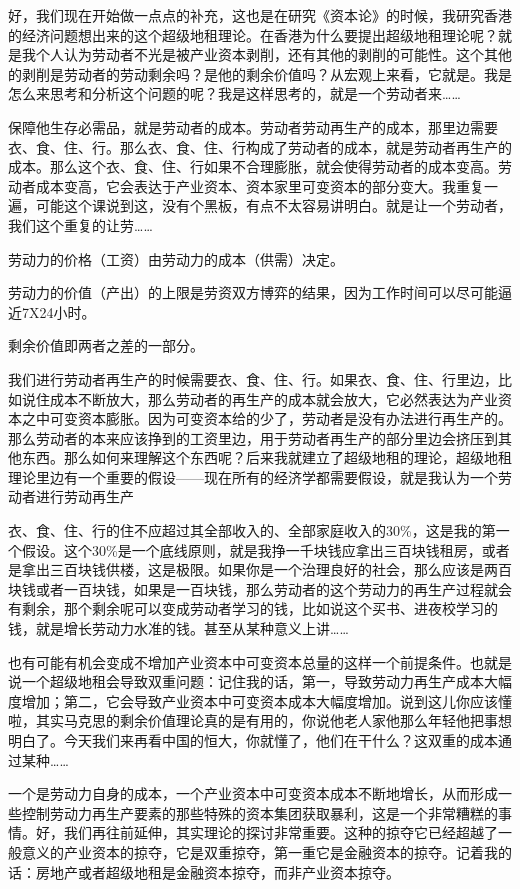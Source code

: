 \documentclass[UTF8, 12pt, a4paper]{ctexrep}
\begin{document}
好，我们现在开始做一点点的补充，这也是在研究《资本论》的时候，我研究香港的经济问题想出来的这个超级地租理论。在香港为什么要提出超级地租理论呢？就是我个人认为劳动者不光是被产业资本剥削，还有其他的剥削的可能性。这个其他的剥削是劳动者的劳动剩余吗？是他的剩余价值吗？从宏观上来看，它就是。我是怎么来思考和分析这个问题的呢？我是这样思考的，就是一个劳动者来……

保障他生存必需品，就是劳动者的成本。劳动者劳动再生产的成本，那里边需要衣、食、住、行。那么衣、食、住、行构成了劳动者的成本，就是劳动者再生产的成本。那么这个衣、食、住、行如果不合理膨胀，就会使得劳动者的成本变高。劳动者成本变高，它会表达于产业资本、资本家里可变资本的部分变大。我重复一遍，可能这个课说到这，没有个黑板，有点不太容易讲明白。就是让一个劳动者，我们这个重复的让劳……

{\kaishu 劳动力的价格（工资）由劳动力的成本（供需）决定。}

{\kaishu 劳动力的价值（产出）的上限是劳资双方博弈的结果，因为工作时间可以尽可能逼近7X24小时。}

{\kaishu 剩余价值即两者之差的一部分。}

我们进行劳动者再生产的时候需要衣、食、住、行。如果衣、食、住、行里边，比如说住成本不断放大，那么劳动者的再生产的成本就会放大，它必然表达为产业资本之中可变资本膨胀。因为可变资本给的少了，劳动者是没有办法进行再生产的。那么劳动者的本来应该挣到的工资里边，用于劳动者再生产的部分里边会挤压到其他东西。那么如何来理解这个东西呢？后来我就建立了超级地租的理论，超级地租理论里边有一个重要的假设——现在所有的经济学都需要假设，就是我认为一个劳动者进行劳动再生产

衣、食、住、行的住不应超过其全部收入的、全部家庭收入的30\%，这是我的第一个假设。这个30\%是一个底线原则，就是我挣一千块钱应拿出三百块钱租房，或者是拿出三百块钱供楼，这是极限。如果你是一个治理良好的社会，那么应该是两百块钱或者一百块钱，如果是一百块钱，那么劳动者的这个劳动力的再生产过程就会有剩余，那个剩余呢可以变成劳动者学习的钱，比如说这个买书、进夜校学习的钱，就是增长劳动力水准的钱。甚至从某种意义上讲……

也有可能有机会变成不增加产业资本中可变资本总量的这样一个前提条件。也就是说一个超级地租会导致双重问题：记住我的话，第一，导致劳动力再生产成本大幅度增加；第二，它会导致产业资本中可变资本成本大幅度增加。说到这儿你应该懂啦，其实马克思的剩余价值理论真的是有用的，你说他老人家他那么年轻他把事想明白了。今天我们来再看中国的恒大，你就懂了，他们在干什么？这双重的成本通过某种……

一个是劳动力自身的成本，一个产业资本中可变资本成本不断地增长，从而形成一些控制劳动力再生产要素的那些特殊的资本集团获取暴利，这是一个非常糟糕的事情。好，我们再往前延伸，其实理论的探讨非常重要。这种的掠夺它已经超越了一般意义的产业资本的掠夺，它是双重掠夺，第一重它是金融资本的掠夺。记着我的话：房地产或者超级地租是金融资本掠夺，而非产业资本掠夺。
\end{document}
